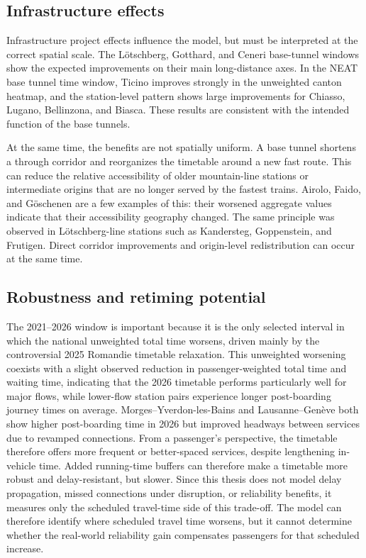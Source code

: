 \documentclass[preprint,12pt]{elsarticle}
\begin{document}
\subsection{Infrastructure effects}\label{sec:discussion-part1-infrastructure}

Infrastructure project effects influence the model, but must be interpreted at the correct spatial scale. The Lötschberg, Gotthard, and Ceneri base-tunnel windows show the expected improvements on their main long-distance axes. In the NEAT base tunnel time window, Ticino improves strongly in the unweighted canton heatmap, and the station-level pattern shows large improvements for Chiasso, Lugano, Bellinzona, and Biasca. These results are consistent with the intended function of the base tunnels.

At the same time, the benefits are not spatially uniform. A base tunnel shortens a through corridor and reorganizes the timetable around a new fast route. This can reduce the relative accessibility of older mountain-line stations or intermediate origins that are no longer served by the fastest trains. Airolo, Faido, and Göschenen are a few examples of this: their worsened aggregate values indicate that their accessibility geography changed. The same principle was observed in Lötschberg-line stations such as Kandersteg, Goppenstein, and Frutigen. Direct corridor improvements and origin-level redistribution can occur at the same time.

\subsection{Robustness and retiming potential}\label{sec:discussion-part1-romandie}

The 2021--2026 window is important because it is the only selected interval in which the national unweighted total time worsens, driven mainly by the controversial 2025 Romandie timetable relaxation. This unweighted worsening coexists with a slight observed reduction in passenger-weighted total time and waiting time, indicating that the 2026 timetable performs particularly well for major flows, while lower-flow station pairs experience longer post-boarding journey times on average. Morges--Yverdon-les-Bains and Lausanne--Genève both show higher post-boarding time in 2026 but improved headways between services due to revamped connections. From a passenger's perspective, the timetable therefore offers more frequent or better-spaced services, despite lengthening in-vehicle time. Added running-time buffers can therefore make a timetable more robust and delay-resistant, but slower. Since this thesis does not model delay propagation, missed connections under disruption, or reliability benefits, it measures only the scheduled travel-time side of this trade-off. The model can therefore identify where scheduled travel time worsens, but it cannot determine whether the real-world reliability gain compensates passengers for that scheduled increase.
\end{document}
